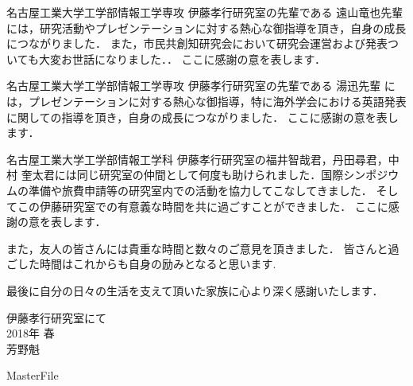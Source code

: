名古屋工業大学工学部情報工学専攻 伊藤孝行研究室の先輩である 遠山竜也先輩 には，研究活動やプレゼンテーションに対する熱心な御指導を頂き，自身の成長につながりました．
また，市民共創知研究会において研究会運営および発表ついても大変お世話になりました．．
ここに感謝の意を表します． \par
\vspace{0.5cm}

名古屋工業大学工学部情報工学専攻 伊藤孝行研究室の先輩である 湯迅先輩 には，プレゼンテーションに対する熱心な御指導，特に海外学会における英語発表に関しての指導を頂き，自身の成長につながりました．
ここに感謝の意を表します． \par
\vspace{0.5cm}

名古屋工業大学工学部情報工学科 伊藤孝行研究室の福井智哉君，丹田尋君，中村 奎太君には同じ研究室の仲間として何度も助けられました．国際シンポジウムの準備や旅費申請等の研究室内での活動を協力してこなしてきました．
そしてこの伊藤研究室での有意義な時間を共に過ごすことができました．
ここに感謝の意を表します． \par
\vspace{0.5cm}

また，友人の皆さんには貴重な時間と数々のご意見を頂きました．
皆さんと過ごした時間はこれからも自身の励みとなると思います.\par
\vspace{0.5cm}

最後に自分の日々の生活を支えて頂いた家族に心より深く感謝いたします．

\begin{flushright}
伊藤孝行研究室にて\\
2018年 春\\
芳野魁
\end{flushright}
\expandafter\ifx\csname MasterFile\endcsname\relax

\fi
